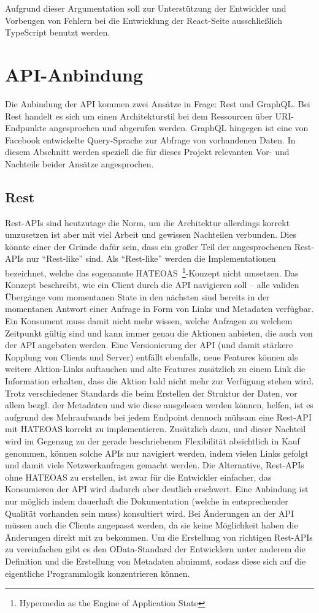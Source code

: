 Aufgrund dieser Argumentation soll zur Unterstützung der Entwickler und Vorbeugen von Fehlern bei die Entwicklung der React-Seite ausschließlich TypeScript benutzt werden. 

\section{API-Anbindung}
Die Anbindung der API kommen zwei Ansätze in Frage: Rest und GraphQL. Bei Rest handelt es sich um einen Architekturstil bei dem Ressourcen über URI-Endpunkte angesprochen und abgerufen werden. GraphQL hingegen ist eine von Facebook entwickelte Query-Sprache zur Abfrage von vorhandenen Daten. In diesem Abschnitt werden speziell die für dieses Projekt relevanten Vor- und Nachteile beider Ansätze angesprochen.

\subsection{Rest}
Rest-APIs sind heutzutage die Norm, um die Architektur allerdings korrekt umzusetzen ist aber mit viel Arbeit und gewissen Nachteilen verbunden. Dies könnte einer der Gründe dafür sein, dass ein großer Teil der angesprochenen Rest-APIs nur ``Rest-like'' sind. Als ``Rest-like'' werden die Implementationen bezeichnet, welche das sogenannte HATEOAS~\footnote{Hypermedia as the Engine of Application State}-Konzept nicht umsetzen. Das Konzept beschreibt, wie ein Client durch die API navigieren soll -- alle validen Übergänge vom momentanen State in den nächsten sind bereits in der momentanen Antwort einer Anfrage in Form von Links und Metadaten verfügbar. Ein Konsument muss damit nicht mehr wissen, welche Anfragen zu welchem Zeitpunkt gültig sind und kann immer genau die Aktionen anbieten, die auch von der API angeboten werden. Eine Versionierung der API (und damit stärkere Kopplung von Clients und Server) entfällt ebenfalls, neue Features können als weitere Aktion-Links auftauchen und alte Features zusätzlich zu einem Link die Information erhalten, dass die Aktion bald nicht mehr zur Verfügung stehen wird. Trotz verschiedener Standards die beim Erstellen der Struktur der Daten, vor allem bezgl. der Metadaten und wie diese ausgelesen werden können, helfen, ist es aufgrund des Mehraufwands bei jedem Endpoint dennoch mühsam eine Rest-API mit HATEOAS korrekt zu implementieren. Zusätzlich dazu, und dieser Nachteil wird im Gegenzug zu der gerade beschriebenen Flexibilität absichtlich in Kauf genommen, können solche APIs nur navigiert werden, indem vielen Links gefolgt und damit viele Netzwerkanfragen gemacht werden. 
Die Alternative, Rest-APIs ohne HATEOAS zu erstellen, ist zwar für die Entwickler einfacher, das Konsumieren der API wird dadurch aber deutlich erschwert. Eine Anbindung ist nur möglich indem dauerhaft die Dokumentation (welche in entsprechender Qualität vorhanden sein muss) konsultiert wird. Bei Änderungen an der API müssen auch die Clients angepasst werden, da sie keine Möglichkeit haben die Änderungen direkt mit zu bekommen.
Um die Erstellung von richtigen Rest-APIs zu vereinfachen gibt es den OData-Standard der Entwicklern unter anderem die Definition und die Erstellung von Metadaten abnimmt, sodass diese sich auf die eigentliche Programmlogik konzentrieren können.


